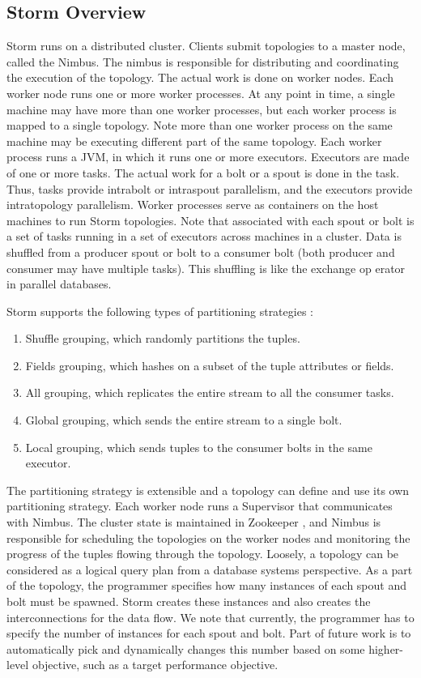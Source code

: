\documentclass[9pt,twocolumn,twoside]{../../styles/osajnl}
\begin{document}
\subsection{Storm Overview}
Storm runs on a distributed cluster. Clients submit topologies to a
master node, called the Nimbus. The nimbus is responsible for
distributing and coordinating the execution of the topology. The
actual work is done on worker nodes. Each worker node runs one or more
worker processes. At any point in time, a single machine may have more
than one worker processes, but each worker process is mapped to a
single topology. Note more than one worker process on the same machine
may be executing different part of the same topology. Each worker
process runs a JVM, in which it runs one or more executors. Executors
are made of one or more tasks. The actual work for a bolt or a spout
is done in the task. Thus, tasks provide intrabolt or intraspout
parallelism, and the executors provide intratopology
parallelism. Worker processes serve as containers on the host machines
to run Storm topologies. Note that associated with each spout or bolt
is a set of tasks running in a set of executors across machines in a
cluster. Data is shuffled from a producer spout or bolt to a consumer
bolt (both producer and consumer may have multiple tasks). This
shuffling is like the exchange op erator in parallel databases.

Storm supports the following types of partitioning strategies \cite{storm}:

\begin{enumerate}  
\item Shuffle grouping, which randomly partitions the tuples.
\item Fields grouping, which hashes on a subset of the tuple
  attributes or fields.
\item All grouping, which replicates the entire stream to all the
  consumer tasks.
\item Global grouping, which sends the entire stream to a single bolt.
\item Local grouping, which sends tuples to the consumer bolts in the
  same executor.
  
\end{enumerate}
The partitioning strategy is extensible and a topology can define and
use its own partitioning strategy.  Each worker node runs a Supervisor
that communicates with Nimbus.  The cluster state is maintained in
Zookeeper \cite{www-zookeeper}, and Nimbus is responsible for scheduling
the topologies on the worker nodes and monitoring the progress of the
tuples flowing through the topology. Loosely, a topology can be
considered as a logical query plan from a database systems
perspective. As a part of the topology, the programmer specifies how
many instances of each spout and bolt must be spawned. Storm creates
these instances and also creates the interconnections for the data
flow. We note that currently, the programmer has to specify the number
of instances for each spout and bolt. Part of future work is to
automatically pick and dynamically changes this number based on some
higher-level objective, such as a target performance objective.
\end{document}

